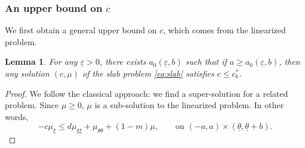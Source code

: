 \documentclass[11pt]{article}    %
\newtheorem{lemma}[theorem]{Lemma}
\renewcommand{\epsilon}{\varepsilon}
\newcommand{\eps}{\varepsilon}
\begin{document}
\subsubsection*{An upper bound on $c$}

We first obtain a general upper bound on $c$, which comes from the linearized problem.

\begin{lemma}\label{lem:upboundc}
For any $\underline\epsilon > 0$, there exists $a_0(\underline\epsilon,b)$ such that if $a \geq a_0(\underline\eps,b)$, then any solution $(c,\mu)$ of the slab problem \eqref{eq:slab} satisfies $c \leq c_b^*$.
\end{lemma}

\begin{proof}%

We follow the classical approach: we find a super-solution for a related problem. Since $\mu \geq 0$, $\mu$ is a sub-solution to the linearized problem.  In other words,
\begin{equation}\label{eq:n}
-c \mu_{\xi}  \leq d \mu_{\xi\xi} + \mu_{\theta\theta}  + \left( 1 - m \right)\mu, \qquad \text{on } (-a,a) \times (\underline\theta, \underline\theta + b).
\end{equation}


\end{proof}
\end{document}

